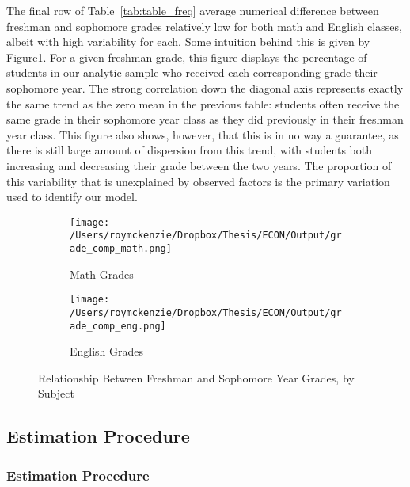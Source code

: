 \documentclass[../thesis_main.tex]{subfiles}
\begin{document}
The final row of Table~\ref{tab:table_freq} average numerical difference between freshman and sophomore grades relatively low for both math and English classes, albeit with high variability for each. Some intuition behind this is given by Figure\ref{fig:grade_comp}. For a given freshman grade, this figure displays the percentage of students in our analytic sample who received each corresponding grade their sophomore year. The strong correlation down the diagonal axis represents exactly the same trend as the zero mean in the previous table: students often receive the same grade in their sophomore year class as they did previously in their freshman year class. This figure also shows, however, that this is in no way a guarantee, as there is still large amount of dispersion from this trend, with students both increasing and decreasing their grade between the two years. The proportion of this variability that is unexplained by observed factors is the primary variation used to identify our model. 

\begin{figure}[H]
	\centering
	\begin{subfigure}[b]{0.49\textwidth}
		\centering
		\texttt{[image: /Users/roymckenzie/Dropbox/Thesis/ECON/Output/grade\_comp\_math.png]}
		\caption{Math Grades}
	\end{subfigure}
	\hfill
	\begin{subfigure}[b]{0.49\textwidth}
		\centering
		\texttt{[image: /Users/roymckenzie/Dropbox/Thesis/ECON/Output/grade\_comp\_eng.png]}
		\caption{English Grades}
	\end{subfigure}
	\caption{Relationship Between Freshman and Sophomore Year Grades, by Subject}
	\label{fig:grade_comp}
\end{figure}

\subsection{Estimation Procedure}

\subsubsection{Estimation Procedure}
\end{document}
